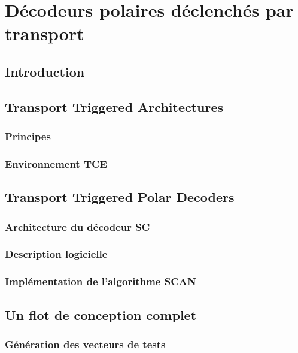 \chapter{Décodeurs polaires déclenchés par transport} %


\vspace*{\fill}
\minitocTITI
\vspace*{\fill}
\newpage

\section*{Introduction}

\section{Transport Triggered Architectures}
\subsection{Principes}
\subsection{Environnement TCE}

\section{Transport Triggered Polar Decoders}

\subsection{Architecture du décodeur SC}
\subsection{Description logicielle}
\subsection{Implémentation de l'algorithme SCAN}

\section{Un flot de conception complet}

\subsection{Génération des vecteurs de tests}
